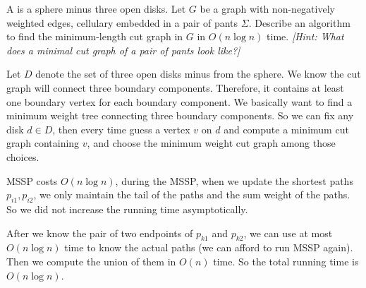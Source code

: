 \documentclass[11pt]{article}
\begin{document}
  A  is a sphere minus three open disks.
  Let \(G\) be a graph with non-negatively weighted edges, cellulary embedded in a pair of pants
  \(\Sigma\).
  Describe an algorithm to find the minimum-length cut graph in \(G\) in \(O(n \log n)\) time.
  \emph{[Hint: What does a minimal cut graph of a pair of pants look like?]}
  \begin{solution}
    Let \(D\) denote the set of three open disks minus from the sphere.
    We know the cut graph will connect three boundary components. Therefore, it contains at least one boundary vertex for each boundary component. We basically want to find a minimum weight tree connecting three boundary components. So we can fix any disk \(d\in D\), then every time guess a vertex \(v\) on \(d\) and compute a minimum cut graph containing \(v\), and choose the minimum weight cut graph among those choices.
MSSP costs \(O(n\log{n})\), during the MSSP, when we update the shortest paths \(p_{i1},p_{i2}\), we only maintain the tail of the paths and the sum weight of the paths. So we did not increase the running time asymptotically.

After we know the pair of two endpoints of \(p_{k1}\) and \(p_{k2}\), we can use at most \(O(n\log{n})\) time to know the actual paths (we can afford to run MSSP again). Then we compute the union of them in \(O(n)\) time. So the total running time is \(O(n\log{n})\).

\end{solution}
\end{document}

